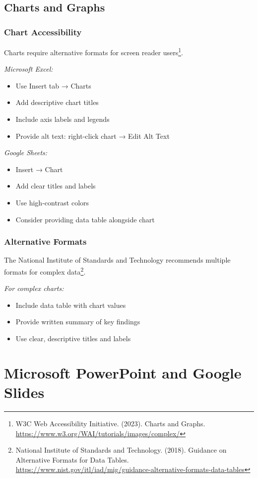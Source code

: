 \subsection{Charts and Graphs}

\subsubsection{Chart Accessibility}
Charts require alternative formats for screen reader users\footnote{W3C Web Accessibility Initiative. (2023). Charts and Graphs. \url{https://www.w3.org/WAI/tutorials/images/complex/}}.

\emph{Microsoft Excel:}
\begin{itemize}
\item Use Insert tab → Charts
\item Add descriptive chart titles
\item Include axis labels and legends
\item Provide alt text: right-click chart → Edit Alt Text
\end{itemize}

\emph{Google Sheets:}
\begin{itemize}
\item Insert → Chart
\item Add clear titles and labels
\item Use high-contrast colors
\item Consider providing data table alongside chart
\end{itemize}

\subsubsection{Alternative Formats}
The National Institute of Standards and Technology recommends multiple formats for complex data\footnote{National Institute of Standards and Technology. (2018). Guidance on Alternative Formats for Data Tables. \url{https://www.nist.gov/itl/iad/mig/guidance-alternative-formats-data-tables}}.

\emph{For complex charts:}
\begin{itemize}
\item Include data table with chart values
\item Provide written summary of key findings
\item Use clear, descriptive titles and labels
\end{itemize}

\section{Microsoft PowerPoint and Google Slides}
\label{sec:ppt-google-slides}

